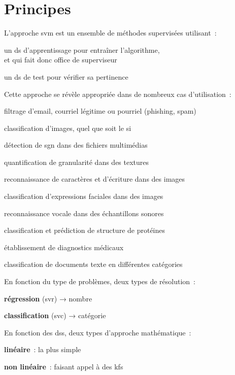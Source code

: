 \section{Principes}

L’approche \gls{svm} est un ensemble de méthodes supervisées utilisant :
\begin{enum}
\item{un \gls{ds} d’apprentissage pour entraîner l’algorithme,\\
et qui fait donc office de superviseur}
\item{un \gls{ds} de test pour vérifier sa pertinence}
\end{enum}

Cette approche se révèle appropriée dans de nombreux cas d’utilisation :
\begin{itmz}
\item{filtrage d’email, courriel légitime ou pourriel (phishing, spam)}
\item{classification d’images, quel que soit le \gls{si}}
\item{détection de \gls{sgn} dans des fichiers multimédias}
\item{quantification de granularité dans des textures}
\item{reconnaissance de caractères et d’écriture dans des images}
\item{classification d’expressions faciales dans des images}
\item{reconnaissance vocale dans des échantillons sonores}
\item{classification et prédiction de structure de protéines}
\item{établissement de diagnostics médicaux}
\item{classification de documents texte en différentes catégories}
\end{itmz}

En fonction du type de problèmes, deux types de résolution :
\begin{itmz}
\item{\textbf{régression} (\gls{svr}) → nombre}
\item{\textbf{classification} (\gls{svc}) → catégorie}
\end{itmz}

En fonction des \glspl{ds}, deux types d’approche mathématique :
\begin{itmz}
\item{\textbf{linéaire} : la plus simple}
\item{\textbf{non linéaire} : faisant appel à des \glspl{kf}}
\end{itmz}

